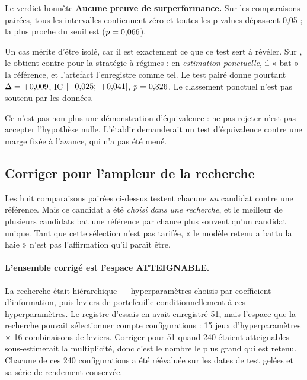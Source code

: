 \begin{resultatbox}{Le verdict honnête}
\textbf{Aucune preuve de surperformance.} Sur les \paireNb{} comparaisons pairées,
tous les intervalles contiennent zéro et toutes les p-values dépassent 0,05 ; la
plus proche du seuil est \paireMinPCas{} ($p = 0{,}066$).

Un cas mérite d'être isolé, car il est exactement ce que ce test sert à révéler.
Sur \paireCasUnivers{}, le \paireCasCandidat{} obtient
\paireCasSharpe{} contre \paireCasRefSharpe{} pour la stratégie à régimes : en
\emph{estimation ponctuelle}, il « bat » la référence, et l'artefact
l'enregistre comme tel. Le test pairé donne pourtant
$\Delta = +0{,}009$, IC $[-0{,}025;\ +0{,}041]$, $p = 0{,}326$. Le classement
ponctuel n'est pas soutenu par les données.

Ce n'est pas non plus une démonstration d'équivalence : ne pas rejeter n'est pas
accepter l'hypothèse nulle. L'établir demanderait un test d'équivalence contre une
marge fixée à l'avance, qui n'a pas été mené.
\end{resultatbox}

\subsection{Corriger pour l'ampleur de la recherche}



Les huit comparaisons pairées ci-dessus testent chacune \emph{un} candidat contre
une référence. Mais ce candidat a été \emph{choisi dans une recherche}, et le
meilleur de plusieurs candidats bat une référence par chance plus souvent qu'un
candidat unique. Tant que cette sélection n'est pas tarifée, « le modèle retenu
a battu la haie » n'est pas l'affirmation qu'il paraît être.

\paragraph{L'ensemble corrigé est l'espace ATTEIGNABLE.} La recherche était
hiérarchique — hyperparamètres choisis par coefficient d'information, puis
leviers de portefeuille conditionnellement à ces hyperparamètres. Le registre
d'essais en avait enregistré 51, mais l'espace que la recherche pouvait
sélectionner compte \correctionCandidats{} configurations : 15 jeux
d'hyperparamètres $\times$ 16 combinaisons de leviers. Corriger pour 51 quand
240 étaient atteignables sous-estimerait la multiplicité, donc c'est le nombre
le plus grand qui est retenu. Chacune de ces 240 configurations a été
réévaluée sur les dates de test gelées et sa série de rendement conservée.

